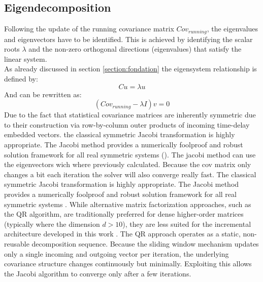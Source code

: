 \subsection{Eigendecomposition}
Following the update of the running covariance matrix $Cov_{running}$, the eigenvalues and eigenvectors have to be identified. This is achieved by identifying the scalar roots $\lambda$ and the non-zero orthogonal directions (eigenvalues) that satisfy the linear system. \\
As already discussed in section \ref{section:fondation} the eigensystem relationship is defined by:
\begin{equation}
Cu = \lambda u
\label{eq:centering_vector}
\end{equation}
And can be rewritten as: 
\begin{equation}
    (Cov_{running}-\lambda I)v = 0
\end{equation}
Due to the fact that statistical covariance matrices are inherently symmetric due to their construction via row-by-column outer products of incoming time-delay embedded vectors. 
the classical symmetric Jacobi transformation is highly appropriate. The Jacobi method provides a numerically foolproof and robust solution framework for all real symmetric systems (\cite{explanationJacobi}).
The jacobi method can use the eigenvectors wich where previously calculated. Because the cov matrix only changes a bit each iteration the solver will also converge really fast. 
The classical symmetric Jacobi transformation is highly appropriate. The Jacobi method provides a numerically foolproof and robust solution framework for all real symmetric systems \cite{explanationJacobi}. 
While alternative matrix factorization approaches, such as the QR algorithm, are traditionally preferred for dense higher-order matrices (typically where the dimension $d > 10$), they are less suited for the incremental architecture developed in this work \cite{explanationJacobi}. The QR approach operates as a static, non-reusable decomposition sequence. 
Because the sliding window mechanism updates only a single incoming and outgoing vector per iteration, the underlying covariance structure changes continuously but minimally.
Exploiting this allows the Jacobi algorithm to converge only after a few iterations.

